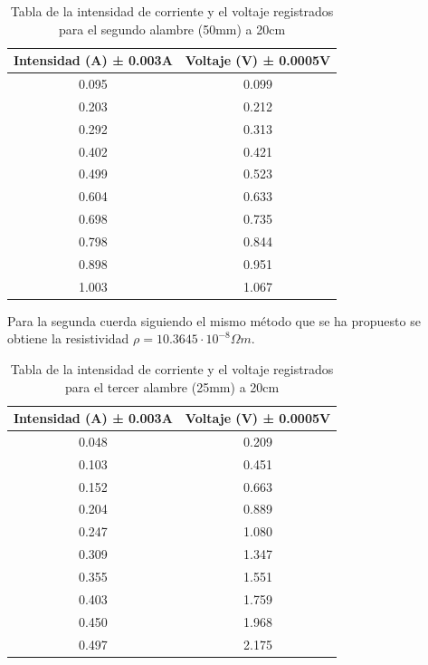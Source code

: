\documentclass[article,12pt]{elsarticle}
\begin{document}
    \begin{table}[H]
\begin{tabular}{|c|c|}
\hline
Intensidad (A) ± 0.003A & Voltaje (V) ± 0.0005V \\ \hline
0.095                   & 0.099                 \\ \hline
0.203                   & 0.212                 \\ \hline
0.292                   & 0.313                 \\ \hline
0.402                   & 0.421                 \\ \hline
0.499                   & 0.523                 \\ \hline
0.604                   & 0.633                 \\ \hline
0.698                   & 0.735                 \\ \hline
0.798                   & 0.844                 \\ \hline
0.898                   & 0.951                 \\ \hline
1.003                   & 1.067                 \\ \hline
\end{tabular}
\caption{Tabla de la intensidad de corriente y el voltaje registrados para el segundo alambre (50mm) a 20cm}
\end{table}

Para la segunda cuerda siguiendo el mismo método que se ha propuesto se obtiene la resistividad $\rho = 10.3645 \cdot 10^{-8} \Omega m$.

    \begin{table}[H]
\begin{tabular}{|c|c|}
\hline
Intensidad (A) ± 0.003A & Voltaje (V) ± 0.0005V \\ \hline
0.048                   & 0.209                 \\ \hline
0.103                   & 0.451                 \\ \hline
0.152                   & 0.663                 \\ \hline
0.204                   & 0.889                 \\ \hline
0.247                   & 1.080                  \\ \hline
0.309                   & 1.347                 \\ \hline
0.355                   & 1.551                 \\ \hline
0.403                   & 1.759                 \\ \hline
0.450                    & 1.968                 \\ \hline
0.497                   & 2.175                 \\ \hline
\end{tabular}
\caption{Tabla de la intensidad de corriente y el voltaje registrados para el tercer alambre (25mm) a 20cm}
\end{table}
\end{document}
